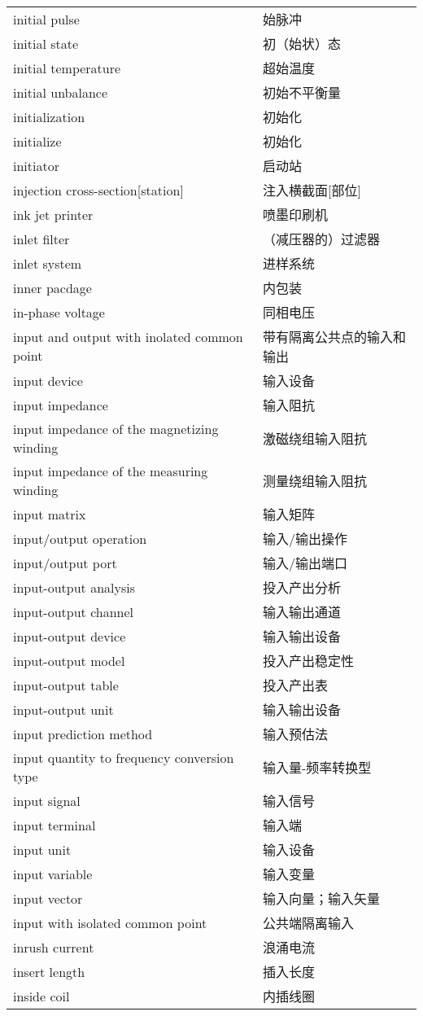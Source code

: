 \documentclass[
]{article}
\begin{document}
\begin{longtable}[]{@{}ll@{}}
initial pulse & 始脉冲 \\
initial state & 初（始状）态 \\
initial temperature & 超始温度 \\
initial unbalance & 初始不平衡量 \\
initialization & 初始化 \\
initialize & 初始化 \\
initiator & 启动站 \\
injection cross-section{[}station{]} & 注入横截面{[}部位{]} \\
ink jet printer & 喷墨印刷机 \\
inlet filter & （减压器的）过滤器 \\
inlet system & 进样系统 \\
inner pacdage & 内包装 \\
in-phase voltage & 同相电压 \\
input and output with inolated common point &
带有隔离公共点的输入和输出 \\
input device & 输入设备 \\
input impedance & 输入阻抗 \\
input impedance of the magnetizing winding & 激磁绕组输入阻抗 \\
input impedance of the measuring winding & 测量绕组输入阻抗 \\
input matrix & 输入矩阵 \\
input/output operation & 输入/输出操作 \\
input/output port & 输入/输出端口 \\
input-output analysis & 投入产出分析 \\
input-output channel & 输入输出通道 \\
input-output device & 输入输出设备 \\
input-output model & 投入产出稳定性 \\
input-output table & 投入产出表 \\
input-output unit & 输入输出设备 \\
input prediction method & 输入预估法 \\
input quantity to frequency conversion type & 输入量-频率转换型 \\
input signal & 输入信号 \\
input terminal & 输入端 \\
input unit & 输入设备 \\
input variable & 输入变量 \\
input vector & 输入向量；输入矢量 \\
input with isolated common point & 公共端隔离输入 \\
inrush current & 浪涌电流 \\
insert length & 插入长度 \\
inside coil & 内插线圈 \\
\bottomrule()
\end{longtable}
\end{document}
